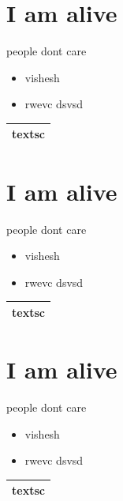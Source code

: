 \documentclass[11pt,a4paper]{article}
\begin{document}
\section{I am alive}

people dont care

\begin{itemize}
  \item vishesh
  \item rwevc dsvsd
\end{itemize}

\begin{table}[!t]
\centering
\begin{tabular}{l}
\hline
textsc \\
\hline

\hline
\end{tabular}
\end{table}

\section{I am alive}

people dont care

\begin{itemize}
  \item vishesh
  \item rwevc dsvsd
\end{itemize}

\begin{table}[!t]
\centering
\begin{tabular}{l}
\hline
textsc \\
\hline

\hline
\end{tabular}
\end{table}

\section{I am alive}

people dont care

\begin{itemize}
  \item vishesh
  \item rwevc dsvsd
\end{itemize}

\begin{table}[!t]
\centering
\begin{tabular}{l}
\hline
textsc \\
\hline

\hline
\end{tabular}
\end{table}
\end{document}
